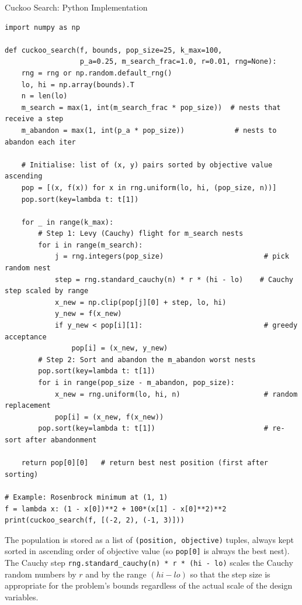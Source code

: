 \documentclass[aspectratio=169,10pt]{beamer}
\begin{document}
\begin{frame}[fragile]{Cuckoo Search: Python Implementation}
\begin{lstlisting}[style=python, caption={Cuckoo Search with Cauchy flights (Python / NumPy)}]
import numpy as np

def cuckoo_search(f, bounds, pop_size=25, k_max=100,
                  p_a=0.25, m_search_frac=1.0, r=0.01, rng=None):
    rng = rng or np.random.default_rng()
    lo, hi = np.array(bounds).T
    n = len(lo)
    m_search = max(1, int(m_search_frac * pop_size))  # nests that receive a step
    m_abandon = max(1, int(p_a * pop_size))            # nests to abandon each iter

    # Initialise: list of (x, y) pairs sorted by objective value ascending
    pop = [(x, f(x)) for x in rng.uniform(lo, hi, (pop_size, n))]
    pop.sort(key=lambda t: t[1])

    for _ in range(k_max):
        # Step 1: Levy (Cauchy) flight for m_search nests
        for i in range(m_search):
            j = rng.integers(pop_size)                        # pick random nest
            step = rng.standard_cauchy(n) * r * (hi - lo)    # Cauchy step scaled by range
            x_new = np.clip(pop[j][0] + step, lo, hi)
            y_new = f(x_new)
            if y_new < pop[i][1]:                             # greedy acceptance
                pop[i] = (x_new, y_new)
        # Step 2: Sort and abandon the m_abandon worst nests
        pop.sort(key=lambda t: t[1])
        for i in range(pop_size - m_abandon, pop_size):
            x_new = rng.uniform(lo, hi, n)                    # random replacement
            pop[i] = (x_new, f(x_new))
        pop.sort(key=lambda t: t[1])                          # re-sort after abandonment

    return pop[0][0]   # return best nest position (first after sorting)

# Example: Rosenbrock minimum at (1, 1)
f = lambda x: (1 - x[0])**2 + 100*(x[1] - x[0]**2)**2
print(cuckoo_search(f, [(-2, 2), (-1, 3)]))
\end{lstlisting}

  The population is stored as a list of \texttt{(position, objective)}
  tuples, always kept sorted in ascending order of objective value
  (so \texttt{pop[0]} is always the best nest).  The Cauchy step
  \texttt{rng.standard\_cauchy(n) * r * (hi - lo)} scales the
  Cauchy random numbers by $r$ and by the range $(hi - lo)$ so
  that the step size is appropriate for the problem's bounds
  regardless of the actual scale of the design variables.

\end{frame}
\end{document}
